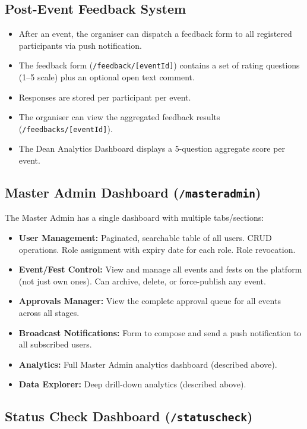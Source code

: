 \documentclass[12pt,a4paper]{article}
\begin{document}
\subsection{Post-Event Feedback System}

\begin{itemize}[leftmargin=*]
    \item After an event, the organiser can dispatch a feedback form to all registered participants via push notification.
    \item The feedback form (\texttt{/feedback/[eventId]}) contains a set of rating questions (1--5 scale) plus an optional open text comment.
    \item Responses are stored per participant per event.
    \item The organiser can view the aggregated feedback results (\texttt{/feedbacks/[eventId]}).
    \item The Dean Analytics Dashboard displays a 5-question aggregate score per event.
\end{itemize}

\subsection{Master Admin Dashboard (\texttt{/masteradmin})}

The Master Admin has a single dashboard with multiple tabs/sections:

\begin{itemize}[leftmargin=*]
    \item \textbf{User Management:} Paginated, searchable table of all users. CRUD operations. Role assignment with expiry date for each role. Role revocation.
    \item \textbf{Event/Fest Control:} View and manage all events and fests on the platform (not just own ones). Can archive, delete, or force-publish any event.
    \item \textbf{Approvals Manager:} View the complete approval queue for all events across all stages.
    \item \textbf{Broadcast Notifications:} Form to compose and send a push notification to all subscribed users.
    \item \textbf{Analytics:} Full Master Admin analytics dashboard (described above).
    \item \textbf{Data Explorer:} Deep drill-down analytics (described above).
\end{itemize}

\subsection{Status Check Dashboard (\texttt{/statuscheck})}
\end{document}
